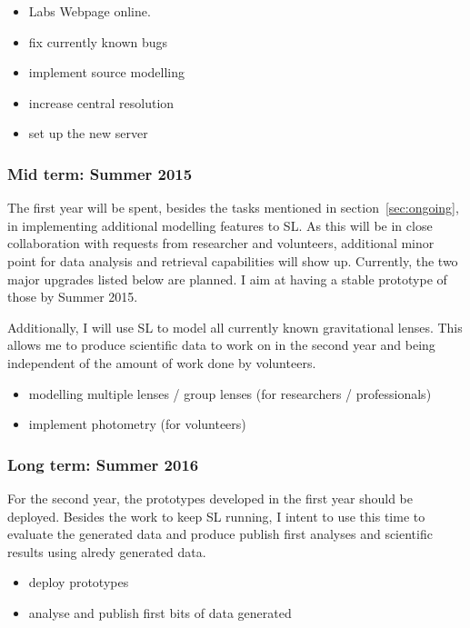 \documentclass[11pt]{article}
\begin{document}
\begin{itemize}
	\item Labs Webpage online.
  \item fix currently known bugs
  \item implement source modelling
  \item increase central resolution
  \item set up the new server
\end{itemize}


\subsubsection{Mid term: Summer 2015}

The first year will be spent, besides the tasks mentioned in section~\ref{sec:ongoing}, in implementing additional modelling features to SL.
As this will be in close collaboration with requests from researcher and volunteers, additional minor point for data analysis and retrieval capabilities will show up.
Currently, the two major upgrades listed below are planned. I aim at having a stable prototype of those by Summer 2015.

Additionally, I will use SL to model all currently known gravitational lenses.
This allows me to produce scientific data to work on in the second year and being independent of the amount of work done by volunteers.


\begin{itemize}
  \item modelling multiple lenses / group lenses (for researchers / professionals)
  \item implement photometry (for volunteers)
\end{itemize}


\subsubsection{Long term: Summer 2016}

For the second year, the prototypes developed in the first year should be deployed.
Besides the work to keep SL running, I intent to use this time to evaluate the generated data and produce publish first analyses and scientific results using alredy generated data.

\begin{itemize}
  \item deploy prototypes
  \item analyse and publish first bits of data generated
\end{itemize}
\end{document}
